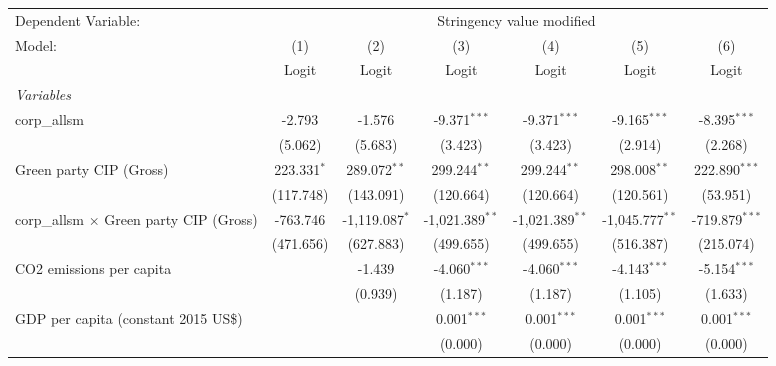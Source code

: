 
\begingroup
\centering
\begin{tabular}{lcccccc}
   \toprule
   Dependent Variable: & \multicolumn{6}{c}{Stringency value modified}\\
   Model:                                         & (1)           & (2)              & (3)               & (4)               & (5)               & (6)\\  
                                                  &  Logit        & Logit            & Logit             & Logit             & Logit             & Logit\\  
   \midrule
   \emph{Variables}\\
   corp\_allsm                                    & -2.793        & -1.576           & -9.371$^{***}$    & -9.371$^{***}$    & -9.165$^{***}$    & -8.395$^{***}$\\   
                                                  & (5.062)       & (5.683)          & (3.423)           & (3.423)           & (2.914)           & (2.268)\\   
   Green party CIP (Gross)                        & 223.331$^{*}$ & 289.072$^{**}$   & 299.244$^{**}$    & 299.244$^{**}$    & 298.008$^{**}$    & 222.890$^{***}$\\   
                                                  & (117.748)     & (143.091)        & (120.664)         & (120.664)         & (120.561)         & (53.951)\\   
   corp\_allsm $\times$ Green party CIP (Gross)   & -763.746      & -1,119.087$^{*}$ & -1,021.389$^{**}$ & -1,021.389$^{**}$ & -1,045.777$^{**}$ & -719.879$^{***}$\\   
                                                  & (471.656)     & (627.883)        & (499.655)         & (499.655)         & (516.387)         & (215.074)\\   
   CO2 emissions per capita                       &               & -1.439           & -4.060$^{***}$    & -4.060$^{***}$    & -4.143$^{***}$    & -5.154$^{***}$\\   
                                                  &               & (0.939)          & (1.187)           & (1.187)           & (1.105)           & (1.633)\\   
   GDP per capita (constant 2015 US\$)            &               &                  & 0.001$^{***}$     & 0.001$^{***}$     & 0.001$^{***}$     & 0.001$^{***}$\\   
                                                  &               &                  & (0.000)           & (0.000)           & (0.000)           & (0.000)\\   

\end{tabular}
